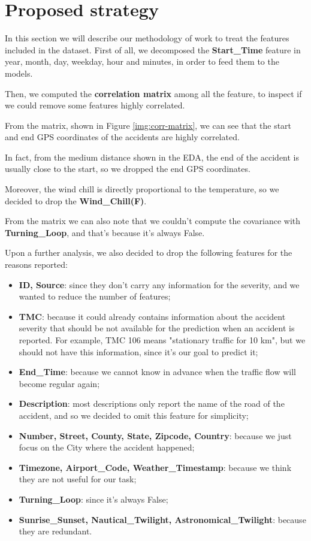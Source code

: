 \documentclass{article}
\begin{document}
\section{Proposed strategy}
In this section we will describe our methodology of work to treat the features included in the dataset.
First of all, we decomposed the \textbf{Start\_Time} feature in year, month, day, weekday, hour and minutes, in order to feed them to the models.

Then, we computed the \textbf{correlation matrix} among all the feature, to inspect if we could remove some features highly correlated.

From the matrix, shown in Figure \ref{img:corr-matrix}, we can see that the start and end GPS coordinates of the accidents are highly correlated.

In fact, from the medium distance shown in the EDA, the end of the accident is usually close to the start, so we dropped the end GPS coordinates.

Moreover, the wind chill is directly proportional to the temperature, so we decided to drop the \textbf{Wind\_Chill(F)}.

From the matrix we can also note that we couldn't compute the covariance with \textbf{Turning\_Loop}, and that's because it's always False.

Upon a further analysis, we also decided to drop the following features for the reasons reported:

\begin{itemize}
\item \textbf{ID, Source}: since they don't carry any information for the severity, and we wanted to reduce the number of features;
\item \textbf{TMC}: because it could already contains information about the accident severity that should be not available for the prediction when an accident is reported. For example, TMC 106 means "stationary traffic for 10 km", but we should not have this information, since it's our goal to predict it;
\item \textbf{End\_Time}: because we cannot know in advance when the traffic flow will become regular again;
\item \textbf{Description}: most descriptions only report the name of the road of the accident, and so we decided to omit this feature for simplicity;
\item \textbf{Number, Street, County, State, Zipcode, Country}: because we just focus on the City where the accident happened;
\item \textbf{Timezone, Airport\_Code, Weather\_Timestamp}: because we think they are not useful for our task;
\item \textbf{Turning\_Loop}: since it's always False;
\item \textbf{Sunrise\_Sunset, Nautical\_Twilight, Astronomical\_Twilight}: because they are redundant.
\end{itemize}
\end{document}
